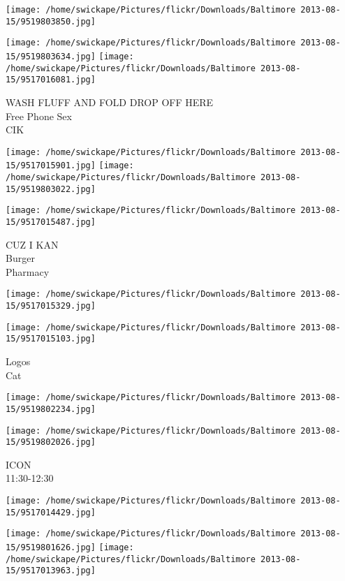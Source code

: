 \documentclass[10pt,letterpaper]{article}
\begin{document}
\texttt{[image: /home/swickape/Pictures/flickr/Downloads/Baltimore 2013-08-15/9519803850.jpg]}

\vspace{0.25in}
\texttt{[image: /home/swickape/Pictures/flickr/Downloads/Baltimore 2013-08-15/9519803634.jpg]}
\texttt{[image: /home/swickape/Pictures/flickr/Downloads/Baltimore 2013-08-15/9517016081.jpg]}

WASH FLUFF AND FOLD DROP OFF HERE\\
Free Phone Sex\\
CIK\\
\pagebreak

\texttt{[image: /home/swickape/Pictures/flickr/Downloads/Baltimore 2013-08-15/9517015901.jpg]}
\texttt{[image: /home/swickape/Pictures/flickr/Downloads/Baltimore 2013-08-15/9519803022.jpg]}

\vspace{0.25in}
\texttt{[image: /home/swickape/Pictures/flickr/Downloads/Baltimore 2013-08-15/9517015487.jpg]}

CUZ I KAN\\
Burger\\
Pharmacy\\
\pagebreak

\texttt{[image: /home/swickape/Pictures/flickr/Downloads/Baltimore 2013-08-15/9517015329.jpg]}

\vspace{0.25in}
\texttt{[image: /home/swickape/Pictures/flickr/Downloads/Baltimore 2013-08-15/9517015103.jpg]}

Logos\\
Cat\\
\pagebreak

\texttt{[image: /home/swickape/Pictures/flickr/Downloads/Baltimore 2013-08-15/9519802234.jpg]}

\vspace{0.25in}
\texttt{[image: /home/swickape/Pictures/flickr/Downloads/Baltimore 2013-08-15/9519802026.jpg]}

ICON\\
11:30{-}12:30\\
\pagebreak

\texttt{[image: /home/swickape/Pictures/flickr/Downloads/Baltimore 2013-08-15/9517014429.jpg]}

\vspace{0.25in}
\texttt{[image: /home/swickape/Pictures/flickr/Downloads/Baltimore 2013-08-15/9519801626.jpg]}
\texttt{[image: /home/swickape/Pictures/flickr/Downloads/Baltimore 2013-08-15/9517013963.jpg]}
\end{document}
